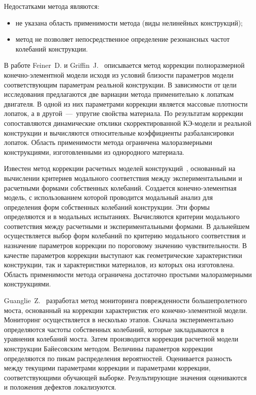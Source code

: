 Недостатками метода являются: 
\begin{itemize}
	\item не указана область применимости метода (виды нелинейных конструкций); 
	\item метод не позволяет непосредственное определение резонансных частот колебаний конструкции. 
\end{itemize}

В работе Feiner~D. и Griffin~J.~\cite{lib:modelUpdating:WO2019209410A1} описывается метод коррекции полноразмерной конечно-элементной модели исходя из условий близости параметров модели соответствующим параметрам реальной конструкции. В зависимости от цели исследования предлагаются две вариации метода применительно к лопаткам двигателя. В одной из них параметрами коррекции является массовые плотности лопаток, а в другой~---~упругие свойства материала. По результатам коррекции сопоставляются динамические отклики скорректированной КЭ-модели и реальной конструкции и вычисляются относительные коэффициенты разбалансировки лопаток. Область применимости метода ограничена малоразмерными конструкциями, изготовленными из однородного материала. 

Известен метод коррекции расчетных моделей конструкций~\cite{lib:modelUpdating:CN106529055A}, основанный на вычислении критериев модального соответствия между экспериментальными и расчетными формами собственных колебаний. Создается конечно-элементная модель, с использованием которой проводится модальный анализ для определения форм собственных колебаний конструкции. Эти формы определяются и в модальных испытаниях. Вычисляются критерии модального соответствия между расчетными и экспериментальными формами. В дальнейшем осуществляется выбор форм колебаний по критерию модального соответствия и назначение параметров коррекции по пороговому значению чувствительности. В качестве параметров коррекции выступают как геометрические характеристики конструкции, так и характеристики материалов, из которых она изготовлена. Область применимости метода ограничена достаточно простыми малоразмерными конструкциями.
 
Guanglie~Z.~\cite{lib:modelUpdating:CN107687872A} разработал метод мониторинга поврежденности большепролетного моста, основанный на коррекции характеристик его конечно-элементной модели. Мониторинг осуществляется в несколько этапов. Сначала экспериментально определяются частоты собственных колебаний, которые закладываются в уравнения колебаний моста. Затем производится коррекция расчетной модели конструкции Байесовским методом. Величины параметров коррекции определяются по пикам распределения вероятностей. Оценивается разность между текущими параметрами коррекции и параметрами коррекции, соответствующими обучающей выборке. Результирующие значения оцениваются и положения дефектов локализуются. 

